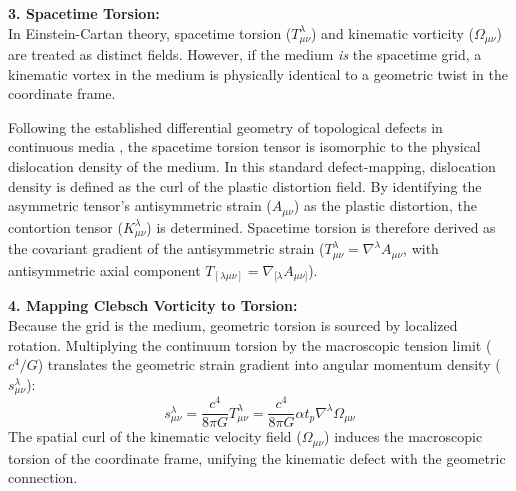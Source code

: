 \vspace{0.2 cm}


\textbf{3. Spacetime Torsion:} \\
In Einstein-Cartan theory, spacetime torsion ($T^\lambda_{\mu\nu}$) and kinematic vorticity ($\Omega_{\mu\nu}$) are treated as distinct fields.   However, if the medium \textit{is} the spacetime grid, a kinematic vortex in the medium is physically identical to a geometric twist in the coordinate frame. 

Following the established differential geometry of topological defects in continuous media \cite{kroner1981continuum, kleinert2008multivalued, katanaev1992theory}, the spacetime torsion tensor is isomorphic to the physical dislocation density of the medium. In this standard defect-mapping, dislocation density is defined as the curl of the plastic distortion field. By identifying the asymmetric tensor's antisymmetric strain ($A_{\mu\nu}$) as the plastic distortion, the contortion tensor ($K^\lambda_{\mu\nu}$) is determined.  Spacetime torsion is therefore derived as the covariant gradient of the antisymmetric strain ($T^\lambda_{\mu\nu} = \nabla^\lambda A_{\mu\nu}$, with antisymmetric axial component $T_{[\lambda\mu\nu]} = \nabla_{[\lambda} A_{\mu\nu]}$). %

\vspace{0.2 cm}

\textbf{4. Mapping Clebsch Vorticity to Torsion:} \\
Because the grid is the medium, geometric torsion is sourced by localized rotation. Multiplying the continuum torsion by the macroscopic tension limit ($c^4/G$) translates the geometric strain gradient into angular momentum density ($s^\lambda_{\mu\nu}$): 
\begin{equation}
    s^\lambda_{\mu\nu} = \frac{c^4}{8\pi G} T^\lambda_{\mu\nu} = \frac{c^4}{8\pi G} \alpha t_p \nabla^\lambda \Omega_{\mu\nu} 
\end{equation}
The spatial curl of the kinematic velocity field ($\Omega_{\mu\nu}$) induces the macroscopic torsion of the coordinate frame, unifying the kinematic defect with the geometric connection.

\vspace{0.2 cm}

